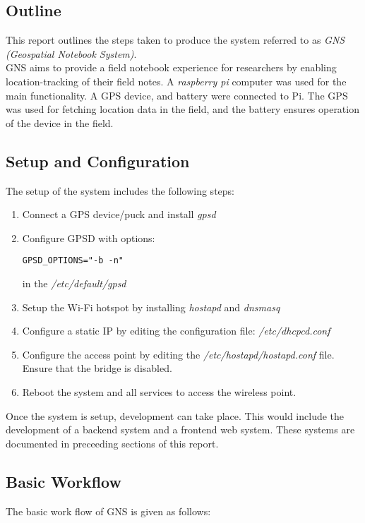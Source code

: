 
\subsection{Outline}
This report outlines the steps taken to produce the system referred to as \textit{GNS (Geospatial Notebook System)}.\\
GNS aims to provide a field notebook experience for researchers by enabling location-tracking of their field notes. A \textit{raspberry pi} computer was used for the main functionality. A GPS device, and battery were connected to Pi. The GPS was used for fetching location data in the field, and the battery ensures operation of the device in the field.

\subsection{Setup and Configuration}
The setup of the system includes the following steps:

\begin{enumerate}
	\item Connect a GPS device/puck and install \textit{gpsd}
\item Configure GPSD with options: \begin{verbatim}GPSD_OPTIONS="-b -n"\end{verbatim} in the \textit{/etc/default/gpsd}
\item Setup the Wi-Fi hotspot by installing \textit{hostapd} and \textit{dnsmasq}
\item Configure a static IP by editing the configuration file: \textit{/etc/dhcpcd.conf}
\item Configure the access point by editing the \textit{/etc/hostapd/hostapd.conf} file. Ensure that the bridge is disabled.
\item Reboot the system and all services to access the wireless point.
\end{enumerate}

\noindent
Once the system is setup, development can take place. This would include the development of a backend system and a frontend web system. These systems are documented in preceeding sections of this report.

\subsection{Basic Workflow}
The basic work flow of GNS is given as follows:

